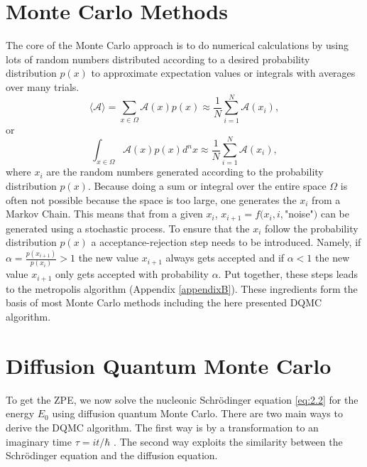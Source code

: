 \documentclass [12pt]{report}
\begin{document}
\section{Monte Carlo Methods}
The core of the Monte Carlo approach is to do numerical calculations by using lots of random numbers distributed according to a desired probability distribution $p(x)$ to approximate expectation values or integrals with averages over many trials.
\begin{equation}
\langle \mathcal{A} \rangle = \sum_{x \in \Omega} \mathcal{A}(x) p(x) \approx \frac{1}{N} \sum_{i=1}^N \mathcal{A}(x_i),
\end{equation}
or
\begin{equation}
\int_{x \in \Omega} \mathcal{A}(x) p(x) d^n x \approx \frac{1}{N} \sum_{i=1}^N \mathcal{A}(x_i),
\end{equation}
where $x_i$ are the random numbers generated according to the probability distribution $p(x)$. Because doing a sum or integral over the entire space $\Omega$ is often not possible because the space is too large, one generates the $x_i$ from a Markov Chain. This means that from a given $x_i$, $x_{i+1} = f(x_i,i,$"noise"$)$ can be generated using a stochastic process. To ensure that the $x_i$ follow the probability distribution $p(x)$ a acceptance-rejection step needs to be introduced. Namely, if $\alpha = \frac{p(x_{i+1})}{p(x_i)} > 1$ the new value $x_{i+1}$ always gets accepted and if $\alpha < 1$ the new value $x_{i+1}$ only gets accepted with probability $\alpha$. Put together, these steps leads to the metropolis algorithm (Appendix \ref{appendixB}). These ingredients form the basis of most Monte Carlo methods including the here presented DQMC algorithm.

\section{Diffusion Quantum Monte Carlo}
To get the ZPE, we now solve the nucleonic Schrödinger equation \eqref{eq:2.2} for the energy $E_0$ using diffusion quantum Monte Carlo. There are two main ways to derive the DQMC algorithm. The first way is by a transformation to an imaginary time $\tau = it/\hbar$ \cite{mccoy,cyrus}. The second way exploits the similarity between the Schrödinger equation and the diffusion equation.
\end{document}
